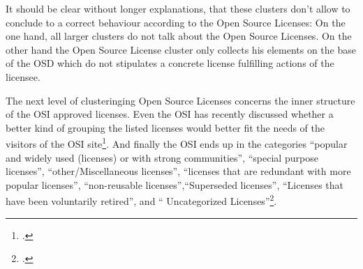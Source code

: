 \begin{center}

\end{center}

It should be clear without longer explanations, that these clusters don't allow
to conclude to a correct behaviour according to the Open Source Licenses: On the
one hand, all larger clusters do not talk about the Open Source Licenses. On the
other hand the Open Source License cluster only collects his elements on the
base of the OSD which do not stipulates a concrete license fulfilling actions
of the licensee.

The next level of clusteringing Open Source Licenses concerns the inner
structure of the OSI approved licenses. Even the OSI has recently discussed
whether a better kind of grouping the listed licenses would better fit the needs
of the visitors of the OSI site\footcite[cf.][\nopage wp]{OSI2013a}. And finally
the OSI ends up in the categories \enquote{popular and widely used (licenses) or
with strong communities}, \enquote{special purpose licenses},
\enquote{other/Miscellaneous licenses}, \enquote{licenses that are redundant
with more popular licenses}, \enquote{non-reusable licenses},\enquote{Superseded
licenses}, \enquote{Licenses that have been voluntarily retired}, and \enquote{
Uncategorized Licenses}\footcite[cf.][\nopage wp]{OSI2013b}.


